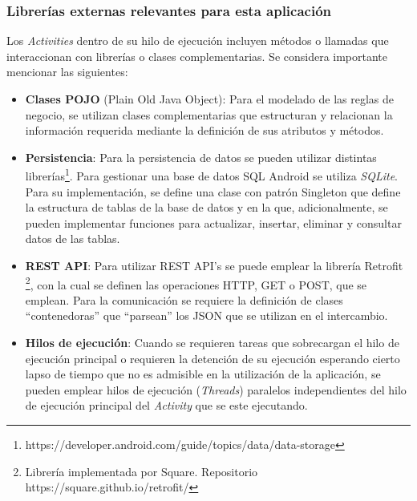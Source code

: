     \subsubsection{Librerías externas relevantes para esta aplicación}
     \par Los \textit{Activities} dentro de su hilo de ejecución incluyen métodos o llamadas que interaccionan con librerías o clases complementarias. Se considera importante mencionar las siguientes:
     \begin{itemize}
         \item \textbf{Clases POJO} (Plain Old Java Object): Para el modelado de las reglas de negocio, se utilizan clases complementarias que estructuran y relacionan la información requerida mediante la definición de sus atributos y métodos.
         
         \item \textbf{Persistencia}: Para la persistencia de datos se pueden utilizar distintas librerías\footnote{https://developer.android.com/guide/topics/data/data-storage}. Para gestionar una base de datos SQL Android  se utiliza \textit{SQLite}. Para su implementación, se define una clase con patrón Singleton que define la estructura de tablas de la base de datos y en la que, adicionalmente, se pueden implementar funciones para actualizar, insertar, eliminar y consultar datos de las tablas.
         
         \item \textbf{REST API}: Para utilizar REST API's se puede emplear la librería Retrofit \footnote{Librería implementada por Square. Repositorio https://square.github.io/retrofit/}, con la cual se definen las operaciones HTTP, GET o POST, que se emplean. Para la comunicación se requiere la definición de clases ``contenedoras'' que ``parsean'' los JSON que se utilizan en el intercambio.  %
         
     
        \item \textbf{Hilos de ejecución}: Cuando se requieren tareas que sobrecargan el hilo de ejecución principal o requieren la detención de su ejecución esperando cierto lapso de tiempo que no es admisible en la utilización de la aplicación, se pueden emplear hilos de ejecución (\textit{Threads}) paralelos independientes del hilo de ejecución principal del \textit{Activity} que se este ejecutando.
        

\end{itemize}
